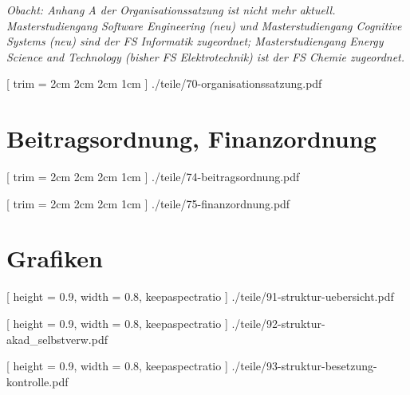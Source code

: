 \documentclass[
	8pt,
	a5paper,
	twoside
	]
	{book}
\begin{document}
\textit{Obacht: Anhang A der Organisationssatzung ist nicht mehr aktuell. Masterstudiengang Software Engineering (neu) und Masterstudiengang Cognitive Systems (neu) sind der FS Informatik zugeordnet; Masterstudiengang Energy Science and Technology (bisher FS Elektrotechnik) ist der FS Chemie zugeordnet.}

\clearpage


	[
		trim = 2cm 2cm 2cm 1cm
	]
	{./teile/70-organisationssatzung.pdf}


\chapter{Beitragsordnung, Finanzordnung}


\clearpage


[
trim = 2cm 2cm 2cm 1cm
]
{./teile/74-beitragsordnung.pdf}


	[
		trim = 2cm 2cm 2cm 1cm
	]
	{./teile/75-finanzordnung.pdf}


\chapter{Grafiken}

\clearpage



	[
		height = 0.9\paperheight,
		width = 0.8\paperwidth,
		keepaspectratio
	]
	{./teile/91-struktur-uebersicht.pdf}




	[
		height = 0.9\paperheight,
		width = 0.8\paperwidth,
		keepaspectratio
	]
	{./teile/92-struktur-akad_selbstverw.pdf}




	[
		height = 0.9\paperheight,
		width = 0.8\paperwidth,
		keepaspectratio
	]
	{./teile/93-struktur-besetzung-kontrolle.pdf}



\backmatter


\end{document}
